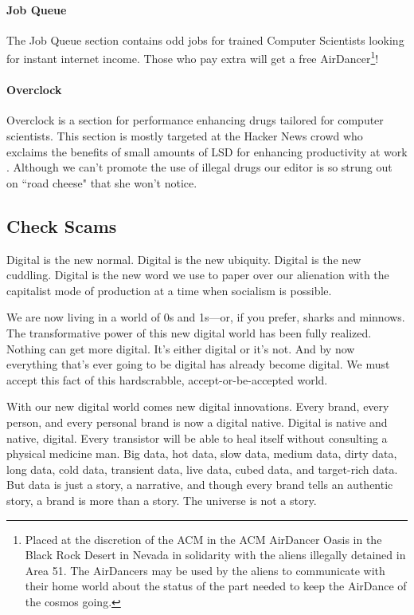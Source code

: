\paragraph{Job Queue}
The Job Queue section contains odd jobs for trained Computer Scientists looking
for instant internet income.
Those who pay extra will get a free AirDancer\footnote{Placed at the discretion
of the ACM in the ACM AirDancer Oasis in the Black Rock Desert in Nevada in
solidarity with the aliens illegally detained in Area 51. The AirDancers may
be used by the aliens to communicate with their home world about the status of the part needed to keep the AirDance of the cosmos going.}!




\paragraph{Overclock}
Overclock is a section for performance enhancing drugs tailored for computer
scientists.
This section is mostly targeted at the Hacker News \cite{hn} crowd who exclaims
the benefits of small amounts of LSD for enhancing productivity at work
\cite{microdose, lsd-song}.
Although we can't promote the use of illegal drugs our editor is so strung out
on ``road cheese" that she won't notice.

\subsection{Check Scams}

Digital is the new normal. Digital is the new ubiquity. Digital is the new cuddling. Digital is the new word we use to paper over our alienation with the capitalist mode of production at a time when socialism is possible.

We are now living in a world of 0s and 1s---or, if you prefer, sharks and minnows. The transformative power of this new digital world has been fully realized. Nothing can get more digital. It's either digital or it's not. And by now everything that's ever going to be digital has already become digital. We must accept this fact of this hardscrabble, accept-or-be-accepted world.

With our new digital world comes new digital innovations. Every brand, every person, and every personal brand is now a digital native. Digital is native and native, digital. Every transistor will be able to heal itself without consulting a physical medicine man. Big data, hot data, slow data, medium data, dirty data, long data, cold data, transient data, live data, cubed data, and target-rich data. But data is just a story, a narrative, and though every brand tells an authentic story, a brand is more than a story. The universe is not a story.

